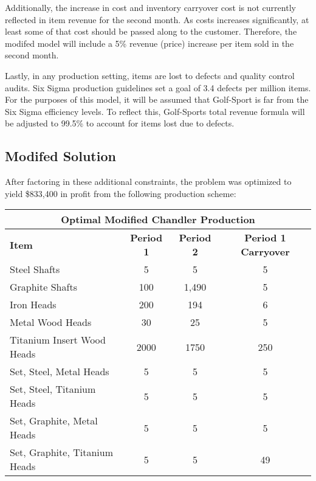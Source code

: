 \documentclass{article}
\begin{document}
\par
Additionally, the increase in cost and inventory carryover cost is not currently reflected in item revenue for the second month.  As costs increases significantly, at least some of that cost should be passed along to the customer.  Therefore, the modifed model will include a 5\% revenue (price) increase per item sold in the second month.
\par
Lastly, in any production setting, items are lost to defects and quality control audits.  Six Sigma production guidelines set a goal of 3.4 defects per million items.  For the purposes of this model, it will be assumed that Golf-Sport is far from the Six Sigma efficiency levels.  To reflect this, Golf-Sports total revenue formula will be adjusted to 99.5\% to account for items lost due to defects.
\subsection{Modifed Solution}
After factoring in these additional constraints, the problem was optimized to yield \$833,400 in profit from the following production scheme:
\\
\noindent
\begin{tabular}{ l c c c }
\hline
\multicolumn{4}{|c|}{Optimal Modified Chandler Production} \\
\hline
\textbf{Item} & \textbf{Period 1} & \textbf{Period 2} & \textbf{Period 1 Carryover} \\
Steel Shafts & 5 & 5 & 5 \\
Graphite Shafts & 100 & 1,490 & 5 \\
Iron Heads & 200 & 194 & 6 \\
Metal Wood Heads & 30 & 25 & 5 \\
Titanium Insert Wood Heads & 2000 & 1750 & 250 \\
Set, Steel, Metal Heads & 5 & 5 & 5 \\
Set, Steel, Titanium Heads & 5 & 5 & 5 \\
Set, Graphite, Metal Heads & 5 & 5 & 5 \\
Set, Graphite, Titanium Heads & 5 & 5 & 49\\
\end{tabular}
\vspace{5mm}
\\
\noindent
\end{document}
